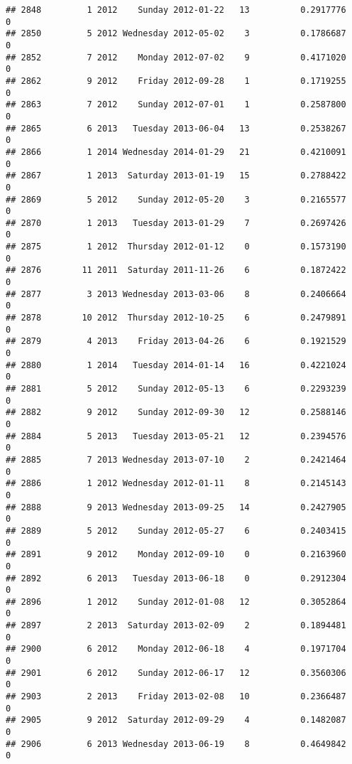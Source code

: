 \documentclass[
]{article}
\begin{document}
\begin{verbatim}
## 2848         1 2012    Sunday 2012-01-22   13          0.2917776             0
## 2850         5 2012 Wednesday 2012-05-02    3          0.1786687             0
## 2852         7 2012    Monday 2012-07-02    9          0.4171020             0
## 2862         9 2012    Friday 2012-09-28    1          0.1719255             0
## 2863         7 2012    Sunday 2012-07-01    1          0.2587800             0
## 2865         6 2013   Tuesday 2013-06-04   13          0.2538267             0
## 2866         1 2014 Wednesday 2014-01-29   21          0.4210091             0
## 2867         1 2013  Saturday 2013-01-19   15          0.2788422             0
## 2869         5 2012    Sunday 2012-05-20    3          0.2165577             0
## 2870         1 2013   Tuesday 2013-01-29    7          0.2697426             0
## 2875         1 2012  Thursday 2012-01-12    0          0.1573190             0
## 2876        11 2011  Saturday 2011-11-26    6          0.1872422             0
## 2877         3 2013 Wednesday 2013-03-06    8          0.2406664             0
## 2878        10 2012  Thursday 2012-10-25    6          0.2479891             0
## 2879         4 2013    Friday 2013-04-26    6          0.1921529             0
## 2880         1 2014   Tuesday 2014-01-14   16          0.4221024             0
## 2881         5 2012    Sunday 2012-05-13    6          0.2293239             0
## 2882         9 2012    Sunday 2012-09-30   12          0.2588146             0
## 2884         5 2013   Tuesday 2013-05-21   12          0.2394576             0
## 2885         7 2013 Wednesday 2013-07-10    2          0.2421464             0
## 2886         1 2012 Wednesday 2012-01-11    8          0.2145143             0
## 2888         9 2013 Wednesday 2013-09-25   14          0.2427905             0
## 2889         5 2012    Sunday 2012-05-27    6          0.2403415             0
## 2891         9 2012    Monday 2012-09-10    0          0.2163960             0
## 2892         6 2013   Tuesday 2013-06-18    0          0.2912304             0
## 2896         1 2012    Sunday 2012-01-08   12          0.3052864             0
## 2897         2 2013  Saturday 2013-02-09    2          0.1894481             0
## 2900         6 2012    Monday 2012-06-18    4          0.1971704             0
## 2901         6 2012    Sunday 2012-06-17   12          0.3560306             0
## 2903         2 2013    Friday 2013-02-08   10          0.2366487             0
## 2905         9 2012  Saturday 2012-09-29    4          0.1482087             0
## 2906         6 2013 Wednesday 2013-06-19    8          0.4649842             0

\end{verbatim}
\end{document}
